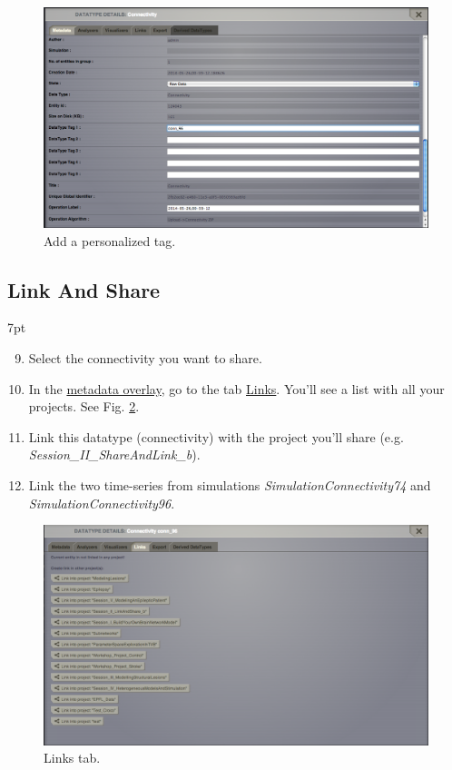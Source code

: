 \documentclass{tufte-handout}
\newenvironment{formal}{%
  \def\FrameCommand{%
    \hspace{1pt}%
    {\color{DarkBlue}\vrule width 2pt}%
    {\color{formalshade}\vrule width 4pt}%
    \colorbox{formalshade}%
  }%
  \MakeFramed{\advance\hsize-\width\FrameRestore}%
  \noindent\hspace{-4.55pt}%
  \begin{adjustwidth}{}{7pt}%
  \vspace{2pt}\vspace{2pt}%
}
{%
  \vspace{2pt}\end{adjustwidth}\endMakeFramed%
}
\begin{document}
\begin{figure}[h]
  \includegraphics[width=\linewidth]{Handout_UI_LinkAndShare_TagDatatype}%
  \caption{Add a personalized tag.}%
  \label{fig:tag}%
\end{figure}


\subsection{Link And Share}\label{sec:link_and_share}
\begin{formal}
\begin{enumerate}[resume]
\setcounter{enumi}{8}
\item Select the connectivity you want to share.
\item In the \underline{metadata overlay}, go to the tab \underline{Links}. You'll see a list with all your projects. See Fig. \ref{fig:linkstab}.
\item Link this datatype (connectivity) with the project you'll share (e.g. \textit{Session\_II\_ShareAndLink\_b}).
\item Link the two time-series from simulations \textit{SimulationConnectivity74} and \textit{SimulationConnectivity96}.
\end{enumerate}
\end{formal} 

\begin{figure}[h]
  \includegraphics[width=\linewidth]{Handout_UI_LinkAndShare_LinksTab}%
  \caption{Links tab.}%
  \label{fig:linkstab}%
\end{figure}
\end{document}
